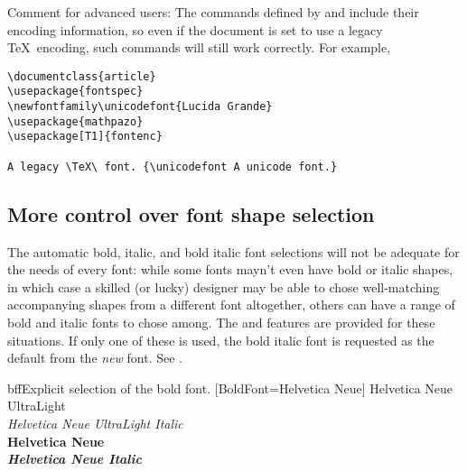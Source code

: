 Comment for advanced users:
The commands defined by  and  include
their encoding information, so even if the document is set to use a
legacy \TeX\ encoding, such commands will still work correctly. For example,
\begin{Verbatim}
\documentclass{article}
\usepackage{fontspec}
\newfontfamily\unicodefont{Lucida Grande}
\usepackage{mathpazo}
\usepackage[T1]{fontenc}

A legacy \TeX\ font. {\unicodefont A unicode font.}

\end{Verbatim}

\subsection{More control over font shape selection}
\label{sec:bfitfonts}


The automatic bold, italic, and bold italic font selections will not be
adequate for the needs of every font: while some fonts mayn't even
have bold or italic shapes, in which case a skilled (or lucky)
designer may be able to chose well-matching accompanying shapes from
a different font altogether, others can have a range of bold and
italic fonts to chose among.  The  and
 features are provided for these situations. If only
one of these is used, the bold italic font is requested as the
default from the \emph{new} font. See .

\begin{Xexample}{bff}{Explicit selection of the bold font.}
           [BoldFont={Helvetica Neue}]
                Helvetica Neue UltraLight         \\
  {\itshape     Helvetica Neue UltraLight Italic} \\
  {\bfseries               Helvetica Neue       } \\
  {\bfseries\itshape       Helvetica Neue Italic} \\
\end{Xexample}

